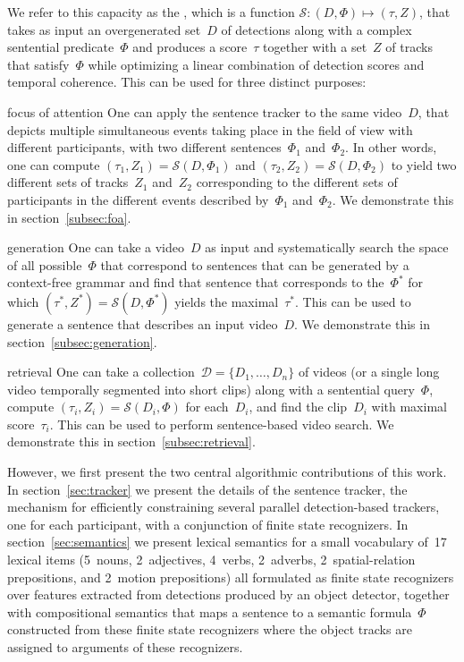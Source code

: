 We refer to this capacity as the , which is a
function $\mathcal{S}:(D,\Phi)\mapsto(\tau,Z)$, that takes as input an
overgenerated set~$D$ of detections along with a complex sentential
predicate~$\Phi$ and produces a score~$\tau$ together with a set~$Z$ of tracks
that satisfy~$\Phi$ while optimizing a linear combination of detection scores
and temporal coherence.
%
This can be used for three distinct purposes:
%
\vspace*{-3ex}
\begin{compactdesc}
\item[focus of attention] One can apply the sentence tracker to the same
  video~$D$, that depicts multiple simultaneous events taking place in the
  field of view with different participants, with two different
  sentences~$\Phi_1$ and~$\Phi_2$.
  In other words, one can compute $(\tau_1,Z_1)=\mathcal{S}(D,\Phi_1)$ and
  $(\tau_2,Z_2)=\mathcal{S}(D,\Phi_2)$ to yield two different sets of
  tracks~$Z_1$ and~$Z_2$ corresponding to the different sets of participants in
  the different events described by~$\Phi_1$ and~$\Phi_2$.
  We demonstrate this in section~\ref{subsec:foa}.
\item[generation] One can take a video~$D$ as input and systematically search
  the space of all possible~$\Phi$ that correspond to sentences that can be
  generated by a context-free grammar and find that sentence that corresponds
  to the~$\Phi^{*}$ for which $(\tau^{*},Z^{*})=\mathcal{S}(D,\Phi^{*})$ yields
  the maximal~$\tau^{*}$.
  This can be used to generate a sentence that describes an input video~$D$.
  We demonstrate this in section~\ref{subsec:generation}.
\item[retrieval] One can take a collection~$\mathcal{D}=\{D_1,\ldots,D_n\}$ of
  videos (or a single long video temporally segmented into short clips) along
  with a sentential query~$\Phi$, compute $(\tau_i,Z_i)=\mathcal{S}(D_i,\Phi)$
  for each~$D_i$, and find the clip~$D_i$ with maximal score~$\tau_i$.
  This can be used to perform sentence-based video search.
  We demonstrate this in section~\ref{subsec:retrieval}.
\end{compactdesc}
\vspace*{-1ex}
%
However, we first present the two central algorithmic contributions of this
work.
%
In section~\ref{sec:tracker} we present the details of the sentence tracker,
the mechanism for efficiently constraining several parallel detection-based
trackers, one for each participant, with a conjunction of finite state
recognizers.
%
In section~\ref{sec:semantics} we present lexical semantics for a small
vocabulary of~17 lexical items (5~nouns, 2~adjectives, 4~verbs, 2~adverbs,
2~spatial-relation prepositions, and 2~motion prepositions) all formulated as
finite state recognizers over features extracted from detections produced by an
object detector, together with compositional semantics that maps a sentence to
a semantic formula~$\Phi$ constructed from these finite state recognizers where
the object tracks are assigned to arguments of these recognizers.

